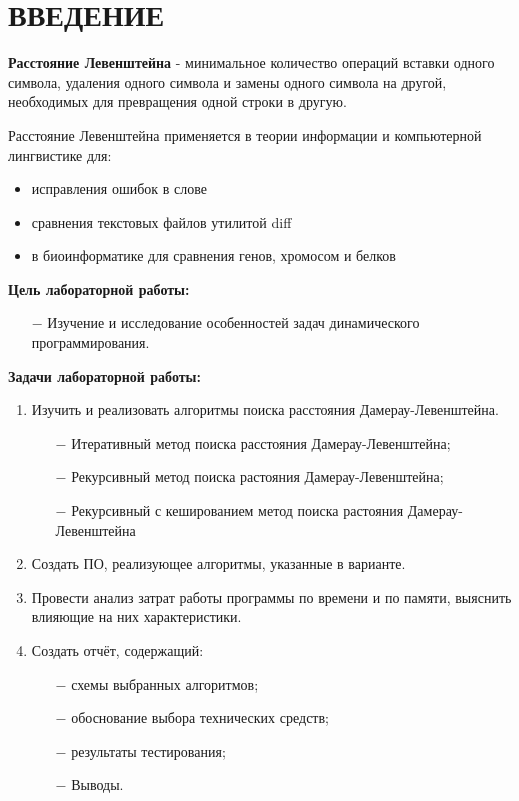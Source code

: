 \chapter*{ВВЕДЕНИЕ}

\textbf{Расстояние Левенштейна} - минимальное количество операций вставки одного символа,
удаления одного символа и замены одного символа на другой, необходимых для превращения одной строки в другую.
\newline

Расстояние Левенштейна применяется в теории информации и компьютерной лингвистике для:

\begin{itemize}
    \item исправления ошибок в слове
    \item сравнения текстовых файлов утилитой diff
    \item в биоинформатике для сравнения генов, хромосом и белков
\end{itemize}

\textbf{Цель лабораторной работы:}
\begin{itemize}
    \item[$-$] Изучение и исследование особенностей задач динамического программирования.
\end{itemize}

\textbf{Задачи лабораторной работы:}
\begin{enumerate}
\item Изучить и реализовать алгоритмы поиска расстояния Дамерау-Левенштейна.
\begin{enumerate}
    \item[$-$] Итеративный метод поиска расстояния Дамерау-Левенштейна;
    \item[$-$] Рекурсивный метод поиска растояния Дамерау-Левенштейна;
    \item[$-$] Рекурсивный с кешированием метод поиска растояния Дамерау-Левенштейна
\end{enumerate}
\item Создать ПО, реализующее алгоритмы, указанные в варианте.
\item Провести анализ затрат работы программы по времени и по памяти, выяснить влияющие на них характеристики.
    \item Создать отчёт, содержащий:
    \begin{enumerate}
        \item[$-$] схемы выбранных алгоритмов;
        \item[$-$] обоснование выбора технических средств;
        \item[$-$] результаты тестирования;
        \item[$-$] Выводы.
    \end{enumerate}
\end{enumerate}

